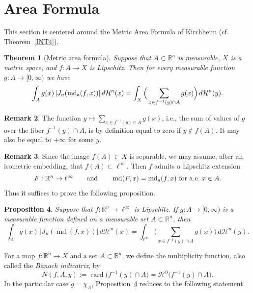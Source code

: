 \documentclass[12pt,leqno]{amsart}
\newtheorem{theorem}{Theorem}
\newtheorem{proposition}[theorem]{Proposition}
\theoremstyle{definition}
\newtheorem{remark}[theorem]{Remark}
\newcommand{\bbbr}{\mathbb R}
\def\card{\operatorname{card}}
\def\H{{\mathcal H}}
\def\md{\operatorname{md}}
\def\apmd{\operatorname{md_{\rm a}}}
\numberwithin{theorem}{section} \numberwithin{equation}{section}
\begin{document}
\section{Area Formula}
\label{AF}

This section is centered around the Metric Area Formula of Kirchheim \cite[Theorem~7 and Corollary~8]{kir} (cf. Theorem~\ref{INT4}).

\begin{theorem}[Metric area formula]
\label{AFT1}
Suppose that $A\subset \bbbr^n$ is measurable, $X$ is a metric space,
and $f:A\to X$ is Lipschitz. Then for every measurable function
$g:A\to [0,\infty)$ we have
$$
\int_A g(x)\, |J_n(\apmd(f,x))|\, d\H^n(x)
=
\int_X
\Big(
\sum_{x\in f^{-1}(y)\cap A} g(x)
\Big)
\,d\H^n(y).
$$
\end{theorem}
\begin{remark}
The function $y\mapsto \sum_{x\in f^{-1}(y)\cap A}g(x)$, i.e., the sum of values of $g$ over the fiber $f^{-1}(y)\cap A$, is by definition equal to zero if $y\not \in f(A)$. It may also be equal to $+\infty$ for some $y$.
\end{remark}


\begin{remark}
Since the image $f(A)\subset X$ is separable, we may assume, after an
isometric embedding, that $f(A)\subset \ell^\infty$. Then $f$ admits a
Lipschitz extension
\[
F:\bbbr^n\to \ell^\infty
\qquad
\text{and}
\qquad
\md(F,x)=\apmd(f,x) \text{ for a.e.\ } x\in A.
\]
Thus it suffices to prove the following proposition.
\end{remark}

\begin{proposition}
\label{AFT2}
Suppose that $f:\bbbr^n\to \ell^\infty$ is Lipschitz. If
$g:A\to [0,\infty)$ is a measurable function defined on a measurable set
$A\subset \bbbr^n$, then
\begin{equation}
\label{AFeq2}
\int_A g(x)\, |J_n(\md(f,x))|\, d\H^n(x)
=
\int_{\ell^\infty}
\Big(
\sum_{x\in f^{-1}(y)\cap A} g(x)
\Big)
\,d\H^n(y).
\end{equation}
\end{proposition}

For a map $f:\bbbr^n\to X$ and a set $A\subset \bbbr^n$, we define the
multiplicity function, also called the {\em Banach indicatrix}, by
\[
N(f,A,y):=\card\big(f^{-1}(y)\cap A\big)
        =\H^0\big(f^{-1}(y)\cap A\big).
\]
In the particular case $g=\chi_A$, Proposition~\ref{AFT2}
reduces to the following statement.
\end{document}
